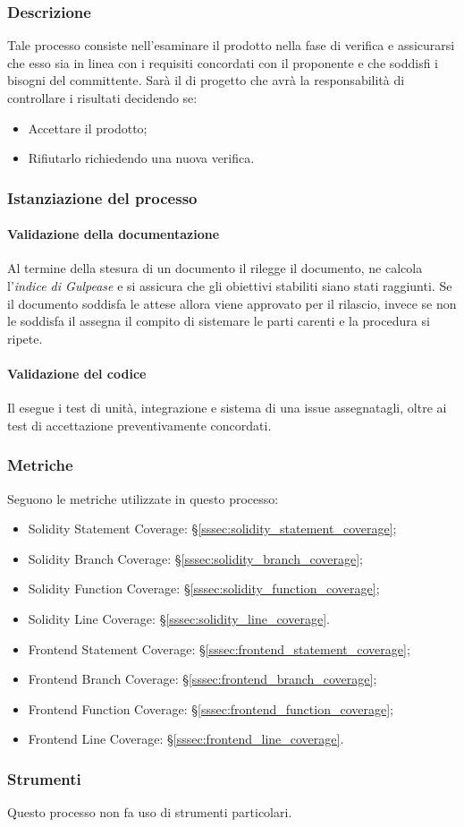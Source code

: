 \subsubsection{Descrizione}
Tale processo consiste nell'esaminare il prodotto nella fase di verifica e assicurarsi che esso sia in linea con i requisiti concordati con il proponente e che soddisfi i bisogni del committente.
Sarà il \roleProjectManagerLow{} di progetto che avrà la responsabilità di controllare i risultati decidendo se:
\begin{itemize}
    \item Accettare il prodotto;
    \item Rifiutarlo richiedendo una nuova verifica.
\end{itemize}
\subsubsection{Istanziazione del processo}
\paragraph{Validazione della documentazione}
Al termine della stesura di un documento il \roleProjectManagerLow{} rilegge il documento, ne calcola l'\textit{indice di Gulpease} e si assicura che gli obiettivi stabiliti siano stati raggiunti.
Se il documento soddisfa le attese allora viene approvato per il rilascio, invece se non le soddisfa il \roleProjectManagerLow{} assegna il compito di sistemare le parti carenti e la procedura si ripete.
\paragraph{Validazione del codice}
Il \roleVerifierLow{} esegue i test di unità, integrazione e sistema di una issue\glo{} assegnatagli, oltre ai test di accettazione preventivamente concordati.
\subsubsection{Metriche}
Seguono le metriche utilizzate in questo processo:
\begin{itemize}
    \item Solidity Statement Coverage: §\ref{sssec:solidity_statement_coverage};
    \item Solidity Branch Coverage: §\ref{sssec:solidity_branch_coverage};
    \item Solidity Function Coverage: §\ref{sssec:solidity_function_coverage};
    \item Solidity Line Coverage: §\ref{sssec:solidity_line_coverage}.
    \item Frontend Statement Coverage: §\ref{sssec:frontend_statement_coverage};
    \item Frontend Branch Coverage: §\ref{sssec:frontend_branch_coverage};
    \item Frontend Function Coverage: §\ref{sssec:frontend_function_coverage};
    \item Frontend Line Coverage: §\ref{sssec:frontend_line_coverage}.
\end{itemize}    
\subsubsection{Strumenti}
Questo processo non fa uso di strumenti particolari.